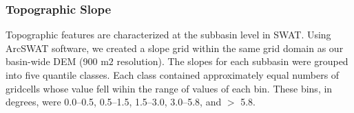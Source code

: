 \subsubsection{Topographic Slope}\label{sec:slope}

Topographic features are characterized at the subbasin level in SWAT. Using ArcSWAT software, we created a slope grid within the same grid domain as our basin-wide DEM (900 m$2$ resolution). The slopes for each subbasin were grouped into five quantile classes. Each class contained approximately equal numbers of gridcells whose value fell wihin the range of values of each bin. These bins, in degrees, were 0.0--0.5, 0.5--1.5, 1.5--3.0, 3.0--5.8, and $>$ 5.8.
